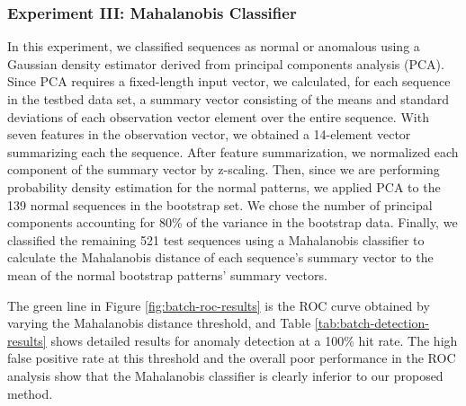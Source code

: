 
\subsubsection{Experiment III: Mahalanobis Classifier}

In this experiment, we classified sequences as normal or anomalous
using a Gaussian density estimator derived from principal components
analysis (PCA).  Since PCA requires a fixed-length input vector, we
calculated, for each sequence in the testbed data set, a summary
vector consisting of the means and standard deviations of each
observation vector element over the entire sequence.  With seven
features in the observation vector, we obtained a 14-element vector
summarizing each the sequence.  After feature summarization, we
normalized each component of the summary vector by z-scaling. Then,
since we are performing probability density estimation for the normal
patterns, we applied PCA to the 139 normal sequences in the bootstrap
set.  We chose the number of principal components accounting for 80\%
of the variance in the bootstrap data. Finally, we classified the
remaining 521 test sequences using a Mahalanobis classifier to calculate 
the Mahalanobis distance of each sequence's summary vector to the mean of
the normal bootstrap patterns' summary vectors.

The green line in Figure \ref{fig:batch-roc-results} is the ROC curve
obtained by varying the Mahalanobis distance threshold, and
Table \ref{tab:batch-detection-results} shows detailed results for
anomaly detection at a 100\% hit rate.  The high false positive rate
at this threshold and the overall poor performance in the ROC analysis
show that the Mahalanobis classifier is clearly inferior to our proposed 
method.

